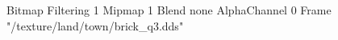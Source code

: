 {Bitmap
	{Filtering 1}
	{Mipmap 1}
	{Blend none}
	{AlphaChannel 0}
	{Frame "/texture/land/town/brick_q3.dds"}
}
